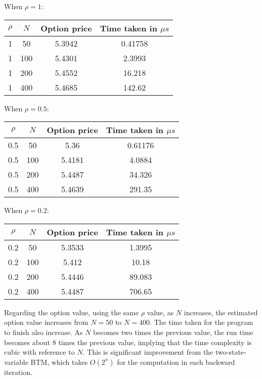 \hspace{23mm} When $\rho=1$:
\begin{center}
	\begin{tabular}{| c | c | c | c |}
		\hline $\rho$ & $N$ & Option price & Time taken in $\mu s$\\
		[0.5ex]
		\hline 1 & 50 & 5.3942 & 0.41758 \\
		\hline 1 & 100 & 5.4301 & 2.3993 \\
		\hline 1 & 200 & 5.4552 & 16.218 \\
		\hline 1 & 400 & 5.4685 & 142.62 \\
		\hline
	\end{tabular}
\end{center}

\hspace{23mm} When $\rho=0.5$:
\begin{center}
	\begin{tabular}{| c | c | c | c |}
		\hline $\rho$ & $N$ & Option price & Time taken in $\mu s$\\
		[0.5ex]
		\hline 0.5 & 50 & 5.36 & 0.61176 \\
		\hline 0.5 & 100 & 5.4181 & 4.0884 \\
		\hline 0.5 & 200 & 5.4487 & 34.326 \\
		\hline 0.5 & 400 & 5.4639 & 291.35 \\
		\hline
	\end{tabular}
\end{center}

\hspace{23mm} When $\rho=0.2$:
\begin{center}
	\begin{tabular}{| c | c | c | c |}
		\hline $\rho$ & $N$ & Option price & Time taken in $\mu s$\\
		[0.5ex]
		\hline 0.2 & 50 & 5.3533 & 1.3995 \\
		\hline 0.2 & 100 & 5.412 & 10.18 \\
		\hline 0.2 & 200 & 5.4446 & 89.083 \\
		\hline 0.2 & 400 & 5.4487 & 706.65 \\
		\hline
	\end{tabular}
\end{center}

Regarding the option value, using the same $\rho$ value, as $N$ increases, the estimated option value increases from $N = 50$ to $N = 400$. The time taken for the program to finish also increase. As $N
$ becomes two times the previous value, the run time becomes about 8 times the previous value, implying that the time complexity is cubic with reference to $N$. This is significant improvement from the two-state-variable BTM, which takes $O(2^n)$ for the computation in each backward iteration.

